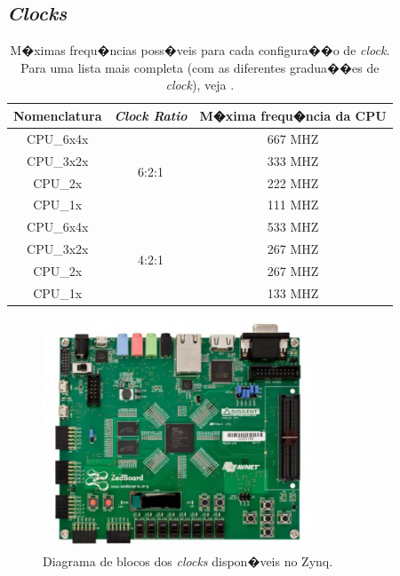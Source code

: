 \documentclass{ufscThesis/ufscThesis} %
\begin{document}
\subsection{\emph{Clocks}}


\cite[p.~622]{ug585}

\begin{table}[ht]
\centering
\begin{tabular}{ccc}
\hline\hline
Nomenclatura & \emph{Clock Ratio} & M�xima frequ�ncia da CPU\\[0.5ex]
\hline
CPU\_6x4x & \multirow{4}{*}{6:2:1} & 667 MHZ\\
CPU\_3x2x &                        & 333 MHZ\\
CPU\_2x   &                        & 222 MHZ\\
CPU\_1x   &                        & 111 MHZ\\
\hline
CPU\_6x4x & \multirow{4}{*}{4:2:1} & 533 MHZ\\
CPU\_3x2x &                        & 267 MHZ\\
CPU\_2x   &                        & 267 MHZ\\
CPU\_1x   &                        & 133 MHZ\\[1ex]
\hline
\end{tabular}
\caption{M�ximas frequ�ncias poss�veis para cada configura��o de \emph{clock}. Para uma lista mais completa (com as diferentes gradua��es de \emph{clock}), veja \cite[p.~13]{data_sheet}.}
\end{table}

\begin{figure}[ht!]
    \centering
    \includegraphics[width=8cm]{figuras/zedboard}
    \caption{Diagrama de blocos dos \emph{clocks} dispon�veis no Zynq.}
\end{figure}
\end{document}
